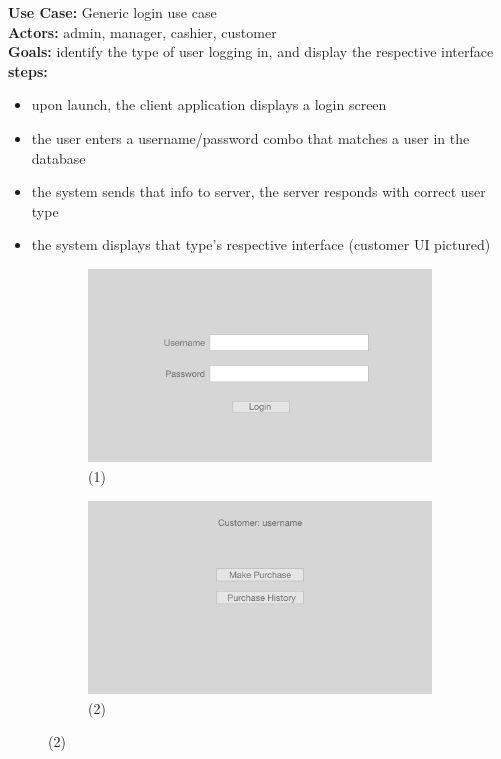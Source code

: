 \documentclass[notitlepage,11pt]{article}
\begin{document}
	\textbf{Use Case:} Generic login use case\\
	\textbf{Actors:} admin, manager, cashier, customer\\
	\textbf{Goals:} identify the type of user logging in, and display the respective interface\\
	\textbf{steps:}
	\begin{itemize}
		\item[(1)] upon launch, the client application displays a login screen
		\item the user enters a username/password combo that matches a user in the database
		\item the system sends that info to server, the server responds with correct user type
		\item[(2)] the system displays that type's respective interface (customer UI pictured)
	\end{itemize}
\begin{figure}[h]
	\begin{subfigure}{.5\textwidth}
	\centering
	\includegraphics[scale=0.12]{LoginUI}
	\caption{(1)}
	\end{subfigure}%
	\begin{subfigure}{.5\textwidth}
	\centering
	\includegraphics[scale=0.12]{CustomerUI}
	\caption{(2)}
	\end{subfigure}
\end{figure}
\newpage
\end{document}
